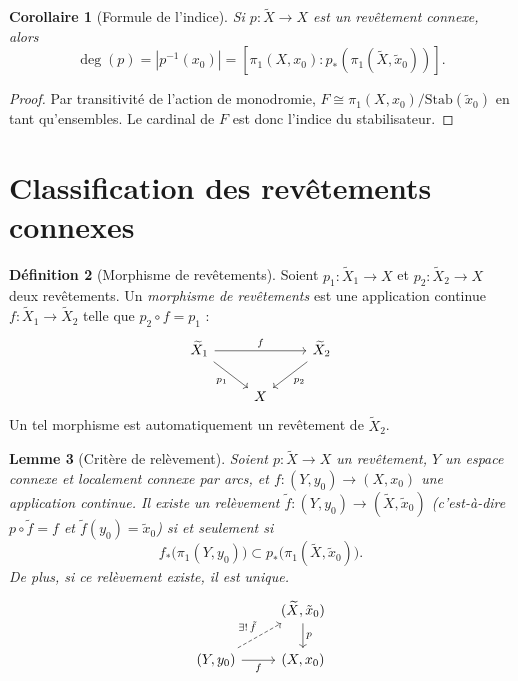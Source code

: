 \documentclass[12pt,a4paper,openany]{book}
\theoremstyle{definition}
\newtheorem{definition}{Définition}[chapter]
\theoremstyle{plain}
\newtheorem{lemme}[definition]{Lemme}
\newtheorem{corollaire}[definition]{Corollaire}
\theoremstyle{remark}
\newcommand{\abs}[1]{\left|#1\right|}
\begin{document}
\begin{corollaire}[Formule de l'indice]\label{cor:formule-indice}
Si $p \colon \widetilde{X} \to X$ est un revêtement connexe, alors
\[
\deg(p) = \abs{p^{-1}(x_0)} = [\pi_1(X, x_0) : p_*(\pi_1(\widetilde{X}, \tilde{x}_0))].
\]
\end{corollaire}

\begin{proof}
Par transitivité de l'action de monodromie, $F \cong \pi_1(X, x_0) / \mathrm{Stab}(\tilde{x}_0)$
en tant qu'ensembles. Le cardinal de $F$ est donc l'indice du stabilisateur.
\end{proof}

\section{Classification des revêtements connexes}\label{sec:classification-rev}

\begin{definition}[Morphisme de revêtements]\label{def:morphisme-rev}
Soient $p_1 \colon \widetilde{X}_1 \to X$ et $p_2 \colon \widetilde{X}_2 \to X$ deux
revêtements. Un \emph{morphisme de revêtements} est une application continue
$f \colon \widetilde{X}_1 \to \widetilde{X}_2$ telle que $p_2 \circ f = p_1$ :
\[
\begin{tikzcd}
\widetilde{X}_1 \arrow[rr, "f"] \arrow[dr, "p_1"'] & & \widetilde{X}_2 \arrow[dl, "p_2"] \\
& X &
\end{tikzcd}
\]
Un tel morphisme est automatiquement un revêtement de $\widetilde{X}_2$.
\end{definition}

\begin{lemme}[Critère de relèvement]\label{lem:critere-relevement}
Soient $p \colon \widetilde{X} \to X$ un revêtement, $Y$ un espace connexe et localement
connexe par arcs, et $f \colon (Y, y_0) \to (X, x_0)$ une application continue. Il existe
un relèvement $\tilde{f} \colon (Y, y_0) \to (\widetilde{X}, \tilde{x}_0)$ (c'est-à-dire
$p \circ \tilde{f} = f$ et $\tilde{f}(y_0) = \tilde{x}_0$) si et seulement si
\[
f_*\!\big(\pi_1(Y, y_0)\big) \subset p_*\!\big(\pi_1(\widetilde{X}, \tilde{x}_0)\big).
\]
De plus, si ce relèvement existe, il est unique.
\[
\begin{tikzcd}
& (\widetilde{X}, \tilde{x}_0) \arrow[d, "p"] \\
(Y, y_0) \arrow[r, "f"'] \arrow[ur, dashed, "\exists!\,\tilde{f}"] & (X, x_0)
\end{tikzcd}
\]
\end{lemme}
\end{document}
